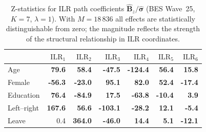 \begin{table}[!ht]
\centering
\small
\caption{Z-statistics for ILR path coefficients $\hat{\mathbf{B}}_z / \hat{\boldsymbol{\sigma}}$ (BES Wave~25, $K=7$, $\lambda=1$). With $M=18\,836$ all effects are statistically distinguishable from zero; the magnitude reflects the strength of the structural relationship in ILR coordinates.}
\label{tab:bes_zstat}
\begin{tabular}{lrrrrrr}
\toprule
 & $\mathrm{ILR}_1$ & $\mathrm{ILR}_2$ & $\mathrm{ILR}_3$ & $\mathrm{ILR}_4$ & $\mathrm{ILR}_5$ & $\mathrm{ILR}_6$ \\
\midrule
Age & \textbf{79.6} & \textbf{58.4} & \textbf{-47.5} & \textbf{-124.4} & \textbf{56.4} & \textbf{15.8} \\
Female & \textbf{-56.3} & \textbf{-23.0} & \textbf{95.1} & \textbf{82.0} & \textbf{52.4} & \textbf{-17.4} \\
Education & \textbf{76.4} & \textbf{-84.9} & \textbf{17.5} & \textbf{-63.8} & \textbf{-10.4} & \textbf{3.9} \\
Left--right & \textbf{167.6} & \textbf{56.6} & \textbf{-103.1} & \textbf{-28.2} & \textbf{12.1} & \textbf{-5.4} \\
Leave & 0.4 & \textbf{364.0} & \textbf{-46.0} & \textbf{14.4} & \textbf{5.1} & \textbf{-12.1} \\
\bottomrule
\end{tabular}
\end{table}

